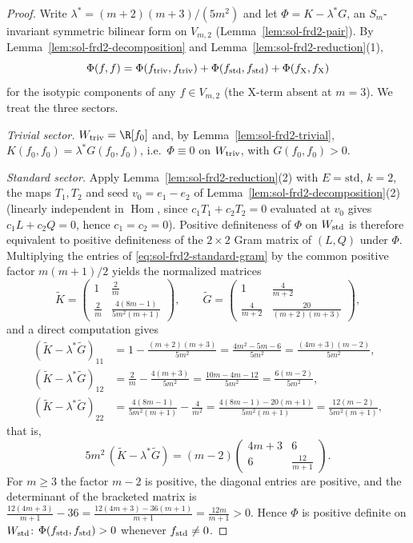 \documentclass[../main.tex]{subfiles}
\begin{document}
\begin{proof}
Write $\lambda^*=(m+2)(m+3)/(5m^2)$ and let $\Phi=K-\lambda^*G$, an
$S_m$-invariant symmetric bilinear form on $V_{m,2}$
(Lemma~\ref{lem:sol-frd2-pair}).  By
Lemma~\ref{lem:sol-frd2-decomposition} and
Lemma~\ref{lem:sol-frd2-reduction}(1),
\[
  \Phi(f,f)=\Phi(f_{\rm triv},f_{\rm triv})
   +\Phi(f_{\rm std},f_{\rm std})+\Phi(f_{\mathrm X},f_{\mathrm X})
\]
for the isotypic components of any $f\in V_{m,2}$ (the $\mathrm X$-term absent at
$m=3$).  We treat the three sectors.

\emph{Trivial sector.}  $W_{\rm triv}=\R[f_0]$ and, by
Lemma~\ref{lem:sol-frd2-trivial},
$K(f_0,f_0)=\lambda^*G(f_0,f_0)$, i.e.\ $\Phi\equiv0$ on $W_{\rm triv}$, with
$G(f_0,f_0)>0$.

\emph{Standard sector.}  Apply Lemma~\ref{lem:sol-frd2-reduction}(2) with
$E=\mathrm{std}$, $k=2$, the maps $T_1,T_2$ and seed $v_0=e_1-e_2$ of
Lemma~\ref{lem:sol-frd2-decomposition}(2) (linearly independent in
$\operatorname{Hom}$, since $c_1T_1+c_2T_2=0$ evaluated at $v_0$ gives
$c_1L+c_2Q=0$, hence $c_1=c_2=0$).  Positive definiteness of $\Phi$ on
$W_{\rm std}$ is therefore equivalent to positive definiteness of the $2\times2$
Gram matrix of $(L,Q)$ under $\Phi$.  Multiplying the entries of
\eqref{eq:sol-frd2-standard-gram} by the common positive factor
$m(m+1)/2$ yields the normalized matrices
\[
  \widetilde K=
  \begin{pmatrix}
    1 & \tfrac2m\\[2pt]
    \tfrac2m & \tfrac{4(8m-1)}{5m^2(m+1)}
  \end{pmatrix},
  \qquad
  \widetilde G=
  \begin{pmatrix}
    1 & \tfrac4{m+2}\\[2pt]
    \tfrac4{m+2} & \tfrac{20}{(m+2)(m+3)}
  \end{pmatrix},
\]
and a direct computation gives
\begin{align*}
  (\widetilde K-\lambda^*\widetilde G)_{11}
  &=1-\frac{(m+2)(m+3)}{5m^2}
   =\frac{4m^2-5m-6}{5m^2}=\frac{(4m+3)(m-2)}{5m^2},\\
  (\widetilde K-\lambda^*\widetilde G)_{12}
  &=\frac2m-\frac{4(m+3)}{5m^2}
   =\frac{10m-4m-12}{5m^2}=\frac{6(m-2)}{5m^2},\\
  (\widetilde K-\lambda^*\widetilde G)_{22}
  &=\frac{4(8m-1)}{5m^2(m+1)}-\frac4{m^2}
   =\frac{4(8m-1)-20(m+1)}{5m^2(m+1)}=\frac{12(m-2)}{5m^2(m+1)},
\end{align*}
that is,
\begin{equation}
  5m^2\,(\widetilde K-\lambda^*\widetilde G)
  =(m-2)
  \begin{pmatrix}
    4m+3 & 6\\[2pt]
    6 & \tfrac{12}{m+1}
  \end{pmatrix}.
  \label{eq:sol-frd2-std-psd}
\end{equation}
For $m\ge3$ the factor $m-2$ is positive, the diagonal entries are positive, and
the determinant of the bracketed matrix is
$\tfrac{12(4m+3)}{m+1}-36=\tfrac{12(4m+3)-36(m+1)}{m+1}=\tfrac{12m}{m+1}>0$.
Hence $\Phi$ is positive definite on $W_{\rm std}$:
$\Phi(f_{\rm std},f_{\rm std})>0$ whenever $f_{\rm std}\ne0$.


\end{proof}
\end{document}
